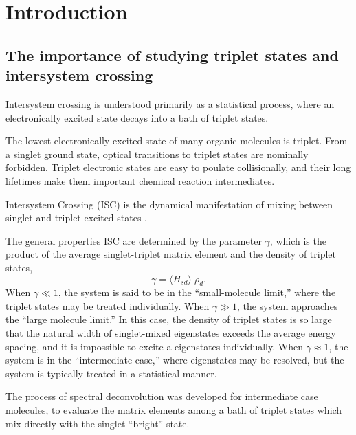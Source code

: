 \documentclass[12pt]{mitthesis}
\begin{document}
\tableofcontents
\clearpage

\chapter{Introduction}
\label{chapter:intro}

\section{The importance of studying triplet states and intersystem
  crossing}

Intersystem crossing is understood primarily as a statistical process,
where an electronically excited state decays into a bath of triplet states.

The lowest electronically excited state of many organic molecules is
triplet.  From a singlet ground state, optical transitions to triplet
states are nominally forbidden.  Triplet electronic states are easy to
poulate collisionally, and their long lifetimes make them important
chemical reaction intermediates.

Intersystem Crossing (ISC) is the dynamical manifestation of mixing
between singlet and triplet excited states \cite{kommandeur87,
  robinson67, tramer05, lombardi88}.

The general properties ISC are determined by the parameter $\gamma$,
which is the product of the average singlet-triplet matrix element and
the density of triplet states,
\begin{equation}
\gamma = \langle H_{sd} \rangle \; \rho_d.
\end{equation}
When $\gamma \ll 1$, the system is said to be in the ``small-molecule
limit,'' where the triplet states may be treated individually.  When
$\gamma \gg 1$, the system approaches the ``large molecule limit.''
In this case, the density of triplet states is so large that the
natural width of singlet-mixed eigenstates exceeds the average energy
spacing, and it is impossible to excite a eigenstates individually.
When $\gamma \approx 1$, the system is in the ``intermediate case,''
where eigenstates may be resolved, but the system is typically treated
in a statistical manner.

The process of spectral deconvolution was developed for intermediate
case molecules, to evaluate the matrix elements among a bath of
triplet states which mix directly with the singlet ``bright'' state.

\end{document}
